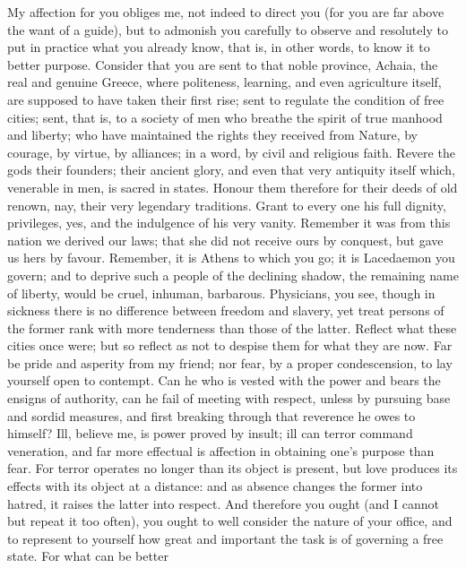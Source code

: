 
My affection for you obliges me, not indeed to direct you (for you are far
above the want of a guide), but to admonish you carefully to observe and
resolutely to put in practice what you already know, that is, in other
words, to know it to better purpose. Consider that you are sent to that
noble province, Achaia, the real and genuine Greece, where politeness,
learning, and even agriculture itself, are supposed to have taken their
first rise; sent to regulate the condition of free cities; sent, that is,
to a society of men who breathe the spirit of true manhood and liberty;
who have maintained the rights they received from Nature, by courage, by
virtue, by alliances; in a word, by civil and religious faith. Revere the
gods their founders; their ancient glory, and even that very antiquity
itself which, venerable in men, is sacred in states. Honour them therefore
for their deeds of old renown, nay, their very legendary traditions. Grant
to every one his full dignity, privileges, yes, and the indulgence of his
very vanity. Remember it was from this nation we derived our laws; that
she did not receive ours by conquest, but gave us hers by favour.
Remember, it is Athens to which you go; it is Lacedaemon you govern; and
to deprive such a people of the declining shadow, the remaining name of
liberty, would be cruel, inhuman, barbarous. Physicians, you see, though
in sickness there is no difference between freedom and slavery, yet treat
persons of the former rank with more tenderness than those of the latter.
Reflect what these cities once were; but so reflect as not to despise them
for what they are now. Far be pride and asperity from my friend; nor fear,
by a proper condescension, to lay yourself open to contempt. Can he who is
vested with the power and bears the ensigns of authority, can he fail of
meeting with respect, unless by pursuing base and sordid measures, and
first breaking through that reverence he owes to himself? Ill, believe me,
is power proved by insult; ill can terror command veneration, and far more
effectual is affection in obtaining one's purpose than fear. For terror
operates no longer than its object is present, but love produces its
effects with its object at a distance: and as absence changes the former
into hatred, it raises the latter into respect. And therefore you ought
(and I cannot but repeat it too often), you ought to well consider the
nature of your office, and to represent to yourself how great and
important the task is of governing a free state. For what can be better
